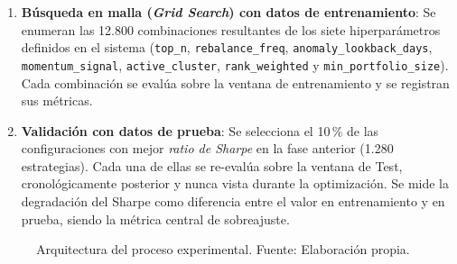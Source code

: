 \begin{enumerate}
    \item \textbf{Búsqueda en malla (\textit{Grid Search})
    con datos de entrenamiento}: Se enumeran las 12.800
    combinaciones resultantes de los
    siete hiperparámetros definidos en el sistema
    (\texttt{top\_n}, \texttt{rebalance\_freq},
    \texttt{anomaly\_lookback\_days}, \texttt{momentum\_signal},
    \texttt{active\_cluster}, \texttt{rank\_weighted} y
    \texttt{min\_portfolio\_size}). Cada combinación se evalúa
    sobre la ventana de entrenamiento y se registran sus
    métricas.

    \item \textbf{Validación con datos de prueba}: Se
    selecciona el 10\,\% de las configuraciones con mejor
    \textit{ratio de Sharpe} en la fase anterior (1.280 estrategias). Cada una de ellas se re-evalúa sobre la
    ventana de Test, cronológicamente posterior y nunca vista
    durante la optimización. Se mide la degradación del Sharpe
    como diferencia entre el valor en entrenamiento y en prueba,
    siendo la métrica central de sobreajuste.
\end{enumerate}

\begin{figure}[H]
    \centering
    \caption{Arquitectura del proceso experimental. Fuente: Elaboración propia.}
    \label{fig:experimental_design}
\end{figure}


